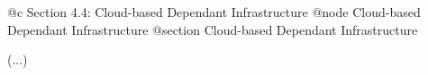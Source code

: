 @c Section 4.4: Cloud-based Dependant Infrastructure
@node Cloud-based Dependant Infrastructure
@section Cloud-based Dependant Infrastructure

(...)
